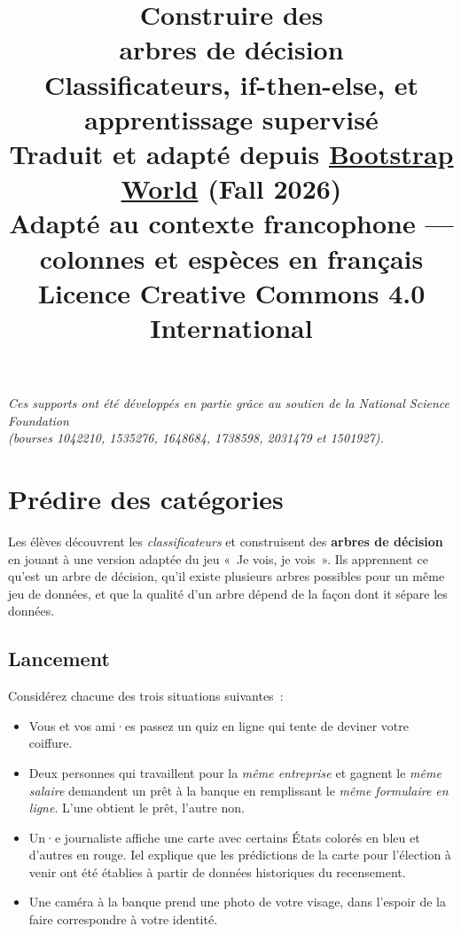 \documentclass[12pt,a4paper]{article}
\title{%
  \vspace{-2cm}
  {\Huge\bfseries Construire des}\\[0.3em]
  {\Huge\bfseries arbres de décision}\\[0.5em]
  {\large Classificateurs, if-then-else, et apprentissage supervisé}\\[1em]
  {\normalsize Traduit et adapté depuis \href{https://www.bootstrapworld.org/materials/fall2026/en-us/lessons/decision-trees-building/}{Bootstrap World} (Fall 2026)}\\
  {\normalsize Adapté au contexte francophone — colonnes et espèces en français}\\[0.5em]
  {\normalsize Licence Creative Commons 4.0 International}
}
\date{}
\author{}
\begin{document}
\maketitle
\thispagestyle{empty}

\vspace{2cm}
\begin{center}
  \textit{Ces supports ont été développés en partie grâce au soutien de la National Science Foundation\\
  (bourses 1042210, 1535276, 1648684, 1738598, 2031479 et 1501927).}
\end{center}

\newpage
\tableofcontents
\newpage

\section{Prédire des catégories}

\begin{overviewbox}
  Les élèves découvrent les \emph{classificateurs} et construisent des \textbf{arbres de décision} en jouant à une version adaptée du jeu «~Je vois, je vois~». Ils apprennent ce qu'est un arbre de décision, qu'il existe plusieurs arbres possibles pour un même jeu de données, et que la qualité d'un arbre dépend de la façon dont it sépare les données.
\end{overviewbox}

\subsection{Lancement}

Considérez chacune des trois situations suivantes~:

\begin{itemize}
  \item Vous et vos ami·es passez un quiz en ligne qui tente de deviner votre coiffure.
  \item Deux personnes qui travaillent pour la \emph{même entreprise} et gagnent le \emph{même salaire} demandent un prêt à la banque en remplissant le \emph{même formulaire en ligne}. L'une obtient le prêt, l'autre non.
  \item Un·e journaliste affiche une carte avec certains États colorés en bleu et d'autres en rouge. Iel explique que les prédictions de la carte pour l'élection à venir ont été établies à partir de données historiques du recensement.
  \item Une caméra à la banque prend une photo de votre visage, dans l'espoir de la faire correspondre à votre identité.
\end{itemize}
\end{document}
